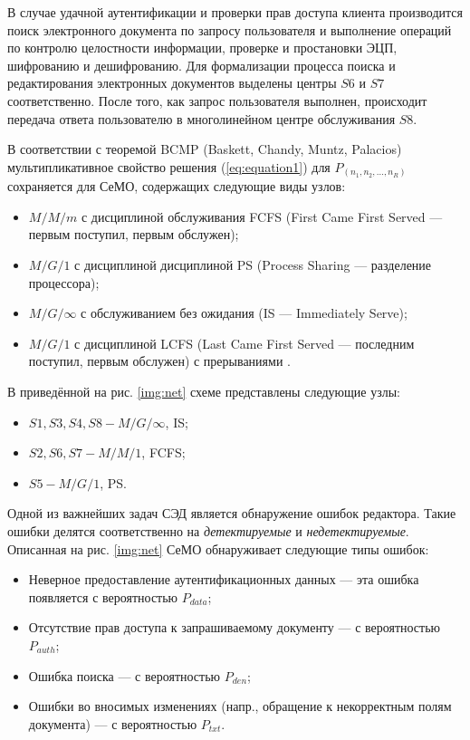\vspace{\baselineskip}
В случае удачной аутентификации и проверки прав доступа клиента производится поиск электронного документа по запросу пользователя и выполнение операций по контролю целостности информации, проверке и простановки ЭЦП, шифрованию и дешифрованию. Для формализации процесса поиска и редактирования электронных документов выделены центры $S6$ и $S7$ соответственно.
После того, как запрос пользователя выполнен, происходит передача ответа пользователю в многолинейном центре обслуживания $S8$.

\vspace{\baselineskip}
В соответствии с теоремой BCMP (Baskett, Chandy, Muntz, Palacios) мультипликативное свойство решения (\ref{eq:equation1}) для $P_(n_1,n_2,\ldots,n_R)$ сохраняется для СеМО, содержащих следующие виды узлов:
\begin{itemize}
  \item $M/M/m$ с дисциплиной обслуживания FCFS (First Came First Served --- первым поступил, первым обслужен);
  \item $M/G/1$ с дисциплиной дисциплиной PS (Process Sharing --- разделение процессора);
  \item $M/G/\infty$ с обслуживанием без ожидания (IS --- Immediately Serve);
  \item $M/G/1$ с дисциплиной LCFS (Last Came First Served --- последним поступил, первым обслужен) с прерываниями \cite{vishnevsky}.
\end{itemize}

В приведённой на рис. \ref{img:net} схеме представлены следующие узлы:
\begin{itemize}
  \item $S1, S3, S4, S8 - M/G/\infty$, IS;
  \item $S2, S6, S7 - M/M/1$, FCFS;
  \item $S5 - M/G/1$, PS.\cite{bykov}
\end{itemize}

Одной из важнейших задач СЭД является обнаружение ошибок редактора. Такие ошибки делятся соответственно на \textit{детектируемые} и \textit{недетектируемые}.
Описанная на рис. \ref{img:net} СеМО обнаруживает следующие типы ошибок:
\begin{itemize}
  \item Неверное предоставление аутентификационных данных --- эта ошибка появляется с вероятностью $P_{data}$;
  \item Отсутствие прав доступа к запрашиваемому документу --- с вероятностью $P_{auth}$;
  \item Ошибка поиска --- с вероятностью $P_{den}$;
  \item Ошибки во вносимых изменениях (напр., обращение к некорректным полям документа) --- с вероятностью $P_{txt}$.
\end{itemize}

